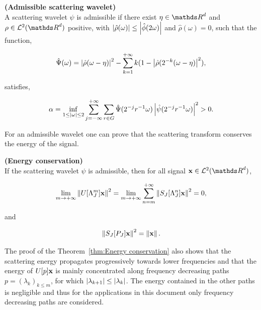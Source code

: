 \documentclass[a4paper,11pt]{report}
\begin{document}
			\begin{defn} \textbf{(Admissible scattering wavelet)}\\ 
				A scattering wavelet $\psi$ is admissible if there exist $\eta \in \dsR^{d}$ and $\rho \in \mcalL^{2}(\dsR^{d})$ positive, with $\left| \hat{\rho}(\omega) \right| \leq \left| \hat{\phi}(2\omega) \right|$ and $\hat{\rho}(\omega)=0$, such that the function,
				
				\begin{equation}
					\hat{\Psi}(\omega) = \left| \hat{\rho}(\omega - \eta) \right|^{2} - \sum_{k=1}^{+\infty}k(1-\left| \hat{\rho}(2^{-k}(\omega - \eta) \right|^{2}),
				\end{equation}
				
				satisfies,
				
				\begin{equation}
				  \alpha = \inf_{1 \leq \left| \omega \right|\leq 2} \sum_{j=-\infty}^{+\infty}\sum_{r \in G} \hat{\Psi}(2^{-j}r^{-1}\omega) \left| \hat{\psi}(2^{-j}r^{-1}\omega) \right|^{2} > 0.\\
				\end{equation}
				
				\label{def:Admissible wavelet}
			\end{defn}

			For an admissible wavelet one can prove that the scattering transform conserves the energy of the signal.
			
			\begin{thm} \textbf{(Energy conservation)}\\ 
				If the scattering wavelet $\psi$ is admissible, then for all signal $\bfx \in \mcalL^{2}(\dsR^{d})$,
				
				\begin{equation}
				  \lim_{m \rightarrow +\infty} \left\lVert U[\Lambda_{J}^{m}]{\bf x} \right\rVert^{2} = \lim_{m \rightarrow +\infty} \sum_{n=m}^{+\infty} \left\lVert S_{J}[\Lambda_{J}^{n}]{\bf x} \right\rVert^{2} = 0,
					\label{eq:energy conservation 1}
				\end{equation}
				
				and
				
				\begin{equation}
				  \left\lVert S_{J}[P_{J}]{\bf x} \right\rVert^{2} = \left\lVert {\bf x} \right\rVert.
				  \label{eq:energy conservation 2}
				\end{equation}
				\label{thm:Energy conservation}
			\end{thm}

			The proof of the Theorem~\ref{thm:Energy conservation} also shows that the scattering energy propagates progressively towards lower frequencies and that the energy of $U[p]{\bf x}$ is mainly concentrated along frequency decreasing paths $p=(\lambda_{k})_{k\leq m}$, \ie for which $\left| \lambda_{k+1} \right| \leq \left| \lambda_{k} \right|$. The energy contained in the other paths is negligible and thus for the applications in this document only frequency decreasing paths are considered.\\
			
\end{document}
